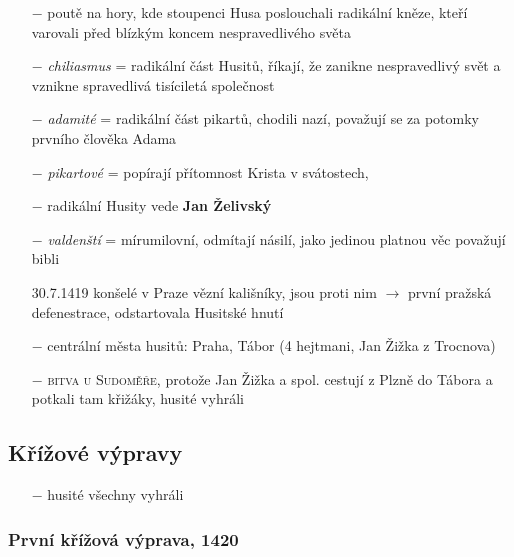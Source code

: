 \documentclass{article}
\begin{document}
\begin{itemize}
    \vspace{-0.5em}
    \setlength\itemsep{0.15em}
    \item[$-$] poutě na hory, kde stoupenci Husa poslouchali radikální kněze, kteří varovali před blízkým koncem nespravedlivého světa
    \item[$-$] \textit{chiliasmus} = radikální část Husitů, říkají, že zanikne nespravedlivý svět a vznikne spravedlivá tisíciletá společnost
    \item[$-$] \textit{adamité} = radikální část pikartů, chodili nazí, považují se za potomky prvního člověka Adama
    \item[$-$] \textit{pikartové} = popírají přítomnost Krista v svátostech,  
    \item[$-$] radikální Husity vede \textbf{Jan Želivský}
    \item[$-$] \textit{valdenští} = mírumilovní, odmítají násilí, jako jedinou platnou věc považují bibli
    \item[30.7.1419] konšelé v Praze vězní kališníky, jsou proti nim $\rightarrow$ první pražská defenestrace, odstartovala Husitské hnutí
    \item[$-$] centrální města husitů: Praha, Tábor (4 hejtmani, Jan Žižka z Trocnova)
    \item[$-$] \textsc{bitva u Sudoměře}, protože Jan Žižka a spol. cestují z Plzně do Tábora a potkali tam křižáky, husité vyhráli
\end{itemize}


\subsection*{Křížové výpravy}
\begin{itemize}
    \vspace{-0.5em}
    \setlength\itemsep{0.15em}
    \item[$-$] husité všechny vyhráli
\end{itemize}

\subsubsection*{První křížová výprava, 1420}
\end{document}
